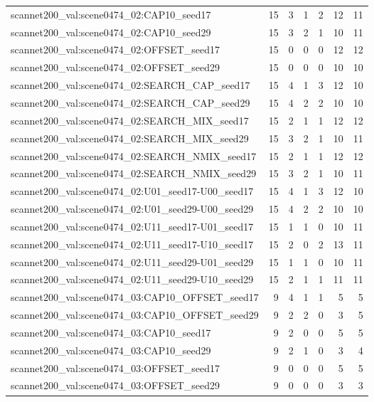\begin{table}[t]
\begin{tabular}{lrrrrrr}
scannet200\_val:scene0474\_02:CAP10\_seed17 & 15 & 3 & 1 & 2 & 12 & 11 \\
scannet200\_val:scene0474\_02:CAP10\_seed29 & 15 & 3 & 2 & 1 & 10 & 11 \\
scannet200\_val:scene0474\_02:OFFSET\_seed17 & 15 & 0 & 0 & 0 & 12 & 12 \\
scannet200\_val:scene0474\_02:OFFSET\_seed29 & 15 & 0 & 0 & 0 & 10 & 10 \\
scannet200\_val:scene0474\_02:SEARCH\_CAP\_seed17 & 15 & 4 & 1 & 3 & 12 & 10 \\
scannet200\_val:scene0474\_02:SEARCH\_CAP\_seed29 & 15 & 4 & 2 & 2 & 10 & 10 \\
scannet200\_val:scene0474\_02:SEARCH\_MIX\_seed17 & 15 & 2 & 1 & 1 & 12 & 12 \\
scannet200\_val:scene0474\_02:SEARCH\_MIX\_seed29 & 15 & 3 & 2 & 1 & 10 & 11 \\
scannet200\_val:scene0474\_02:SEARCH\_NMIX\_seed17 & 15 & 2 & 1 & 1 & 12 & 12 \\
scannet200\_val:scene0474\_02:SEARCH\_NMIX\_seed29 & 15 & 3 & 2 & 1 & 10 & 11 \\
scannet200\_val:scene0474\_02:U01\_seed17-U00\_seed17 & 15 & 4 & 1 & 3 & 12 & 10 \\
scannet200\_val:scene0474\_02:U01\_seed29-U00\_seed29 & 15 & 4 & 2 & 2 & 10 & 10 \\
scannet200\_val:scene0474\_02:U11\_seed17-U01\_seed17 & 15 & 1 & 1 & 0 & 10 & 11 \\
scannet200\_val:scene0474\_02:U11\_seed17-U10\_seed17 & 15 & 2 & 0 & 2 & 13 & 11 \\
scannet200\_val:scene0474\_02:U11\_seed29-U01\_seed29 & 15 & 1 & 1 & 0 & 10 & 11 \\
scannet200\_val:scene0474\_02:U11\_seed29-U10\_seed29 & 15 & 2 & 1 & 1 & 11 & 11 \\
scannet200\_val:scene0474\_03:CAP10\_OFFSET\_seed17 & 9 & 4 & 1 & 1 & 5 & 5 \\
scannet200\_val:scene0474\_03:CAP10\_OFFSET\_seed29 & 9 & 2 & 2 & 0 & 3 & 5 \\
scannet200\_val:scene0474\_03:CAP10\_seed17 & 9 & 2 & 0 & 0 & 5 & 5 \\
scannet200\_val:scene0474\_03:CAP10\_seed29 & 9 & 2 & 1 & 0 & 3 & 4 \\
scannet200\_val:scene0474\_03:OFFSET\_seed17 & 9 & 0 & 0 & 0 & 5 & 5 \\
scannet200\_val:scene0474\_03:OFFSET\_seed29 & 9 & 0 & 0 & 0 & 3 & 3 \\

\end{tabular}
\end{table}
